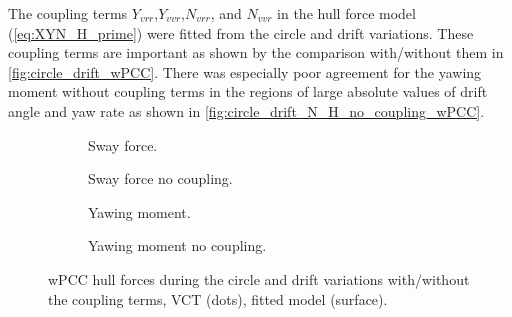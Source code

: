 The coupling terms $Y_{vrr}$,$Y_{vvr}$,$N_{vrr}$, and $N_{vvr}$ in the hull force model (\autoref{eq:XYN_H_prime}) were fitted from the circle and drift variations. These coupling terms are important as shown by the comparison with/without them in \autoref{fig:circle_drift_wPCC}. There was especially poor agreement for the yawing moment without coupling terms in the regions of large absolute values of drift angle and yaw rate as shown in \autoref{fig:circle_drift_N_H_no_coupling_wPCC}.
\begin{figure}[h]
     \centering
     \begin{subfigure}[b]{0.49\textwidth}
         \centering
         
        \caption{Sway force.}
        \label{fig:circle_drift_Y_H_wPCC}
     \end{subfigure}
     \hfill
     \begin{subfigure}[b]{0.49\textwidth}
         \centering
         
        \caption{Sway force no coupling.}
        \label{fig:circle_drift_Y_H_no_coupling_wPCC}
     \end{subfigure}

     \vfill
     \begin{subfigure}[b]{0.49\textwidth}
         \centering
         
        \caption{Yawing moment.}
        \label{fig:circle_drift_N_H_wPCC}
     \end{subfigure}
     \hfill
     \begin{subfigure}[b]{0.49\textwidth}
         \centering
         
        \caption{Yawing moment no coupling.}
        \label{fig:circle_drift_N_H_no_coupling_wPCC}
     \end{subfigure}
     
    \caption{wPCC hull forces during the circle and drift variations with/without the coupling terms, VCT (dots), fitted model (surface).}
    \label{fig:circle_drift_wPCC}
\end{figure}






